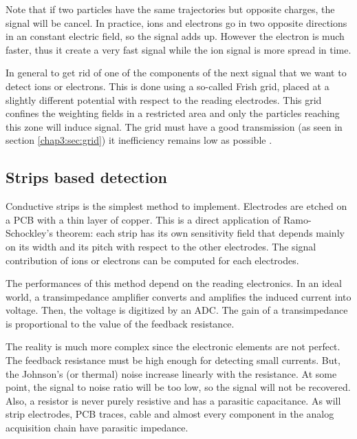 \begin{refsection}
	Note that if two particles have the same trajectories but opposite charges, the signal will be cancel. In practice, ions and electrons go in two opposite directions in an constant electric field, so the signal adds up. However the electron is much faster, thus it create a very fast signal while the ion signal is more spread in time.

	In general to get rid of one of the components of the next signal that we want to detect ions or electrons. This is done using a so-called Frish grid, placed at a slightly different potential with respect to the reading electrodes. This grid confines the weighting fields in a restricted area and only the particles reaching this zone will induce signal. The grid must have a good transmission (as seen in section \ref{chap3:sec:grid}) it inefficiency remains low as possible \cite{Khriachkov1997,Gook2012}.



  \subsection{Strips based detection}
  Conductive strips is the simplest method to implement. Electrodes are etched on a PCB with a thin layer of copper. This is a direct application of Ramo-Schockley's theorem: each strip has its own sensitivity field that depends mainly on its width and its pitch with respect to the other electrodes. The signal contribution of ions or electrons can be computed for each electrodes.

  The performances of this method depend on the reading electronics. In an ideal world, a transimpedance amplifier converts and amplifies the induced current into voltage. Then, the voltage is digitized by an ADC. The gain of a transimpedance is proportional to the value of the feedback resistance.

  The reality is much more complex since the electronic elements are not perfect. The feedback resistance must be high enough for detecting small currents. But, the Johnson’s (or thermal) noise increase linearly with the resistance. At some point, the signal to noise ratio will be too low, so the signal will not be recovered. Also, a resistor is never purely resistive and has a parasitic capacitance. As will strip electrodes, PCB traces, cable and almost every component in the analog acquisition chain have parasitic impedance.


\end{refsection}
